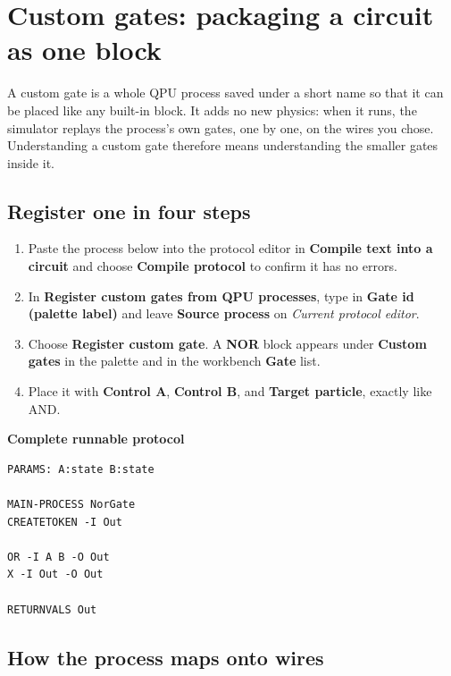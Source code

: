 \section{Custom gates: packaging a circuit as one block}
\hypertarget{custom-gates}{}

A custom gate is a whole QPU process saved under a short name so that it can
be placed like any built-in block. It adds no new physics: when it runs, the
simulator replays the process's own gates, one by one, on the wires you
chose. Understanding a custom gate therefore means understanding the smaller
gates inside it.

\subsection{Register one in four steps}

\begin{enumerate}
  \item Paste the process below into the protocol editor in
  \textbf{Compile text into a circuit} and choose \textbf{Compile protocol}
  to confirm it has no errors.
  \item In \textbf{Register custom gates from QPU processes}, type
   in \textbf{Gate id (palette label)} and leave
  \textbf{Source process} on \emph{Current protocol editor}.
  \item Choose \textbf{Register custom gate}. A \textbf{NOR} block appears
  under \textbf{Custom gates} in the palette and in the workbench
  \textbf{Gate} list.
  \item Place it with \textbf{Control A}, \textbf{Control B}, and
  \textbf{Target particle}, exactly like AND.
\end{enumerate}

\textbf{Complete runnable protocol}
\begin{lstlisting}
PARAMS: A:state B:state

MAIN-PROCESS NorGate
CREATETOKEN -I Out

OR -I A B -O Out
X -I Out -O Out

RETURNVALS Out
\end{lstlisting}

\subsection{How the process maps onto wires}


